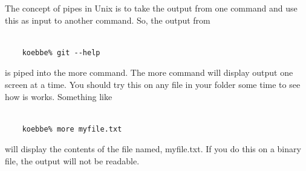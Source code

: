 \documentclass[10pt,fleqn]{article}
\begin{document}
The concept of pipes in Unix is to take the output from one command and use
this as input to another command. So, the output from
\begin{verbatim}

    koebbe% git --help

\end{verbatim}
is piped into the more command. The more command will display output one screen
at a time. You should try this on any file in your folder some time to see how
is works. Something like
\begin{verbatim}

    koebbe% more myfile.txt

\end{verbatim}
will display the contents of the file named, myfile.txt. If you do this on a
binary file, the output will not be readable.
\end{document}
